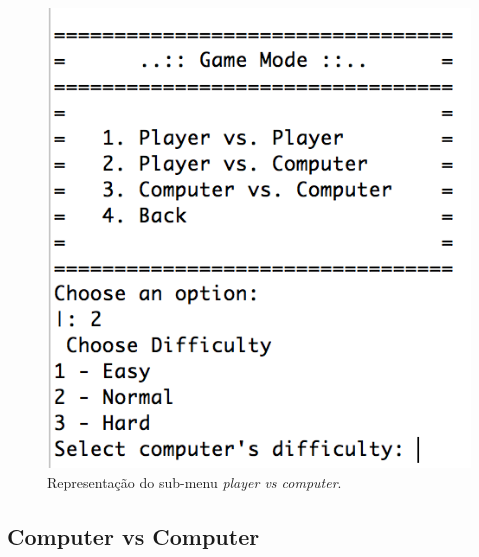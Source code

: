 \documentclass[a4paper]{article}
\begin{document}
\begin{figure}[!ht]
	\begin{center}
	\includegraphics[scale=0.5]{img/player_vs_computer.png}
	\caption{Representação do sub-menu \textit{player vs computer}.}
    \label{Fig:player_vs_computer}
	\end{center}
\end{figure}

\newpage

\subsection{Computer vs Computer}
\end{document}
